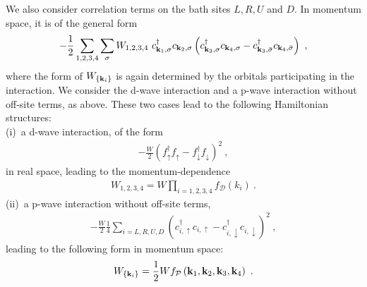 \documentclass[reprint,hidelinks]{revtex4-2}
\begin{document}
We also consider correlation terms on the bath sites \(L,R,U\) and \(D\). In momentum space, it is of the general form
\begin{equation}\begin{aligned}
-\frac{1}{2}\sum_{1, 2, 3, 4}\sum_\sigma W_{1,2,3,4}~ c^\dagger_{{\bf k}_1,\sigma}c_{{\bf k}_2,\sigma}\left(c^\dagger_{{\bf k}_3,\sigma}c_{{\bf k}_4,\sigma} - c^\dagger_{{\bf k}_3,\bar\sigma}c_{{\bf k}_4,\bar\sigma}\right) ~,
\end{aligned}\end{equation}
where the form of \(W_{\left\{{\bf k}_i\right\}}\) is again determined by the orbitals participating in the interaction. We consider the d-wave interaction and a p-wave interaction without off-site terms, as above. These two cases lead to the following Hamiltonian structures:\\
(i)~a d-wave interaction, of the form 
\begin{equation}\begin{aligned}
	-\frac{W}{2}\left(f^\dagger_{\uparrow}f_{\uparrow} - f^\dagger_{\downarrow}f_{\downarrow}\right)^2~,
\end{aligned}\end{equation}
in real space, leading to the momentum-dependence
\begin{equation}\begin{aligned}\label{W_dwave}
	W_{1,2,3,4} = W\prod_{i=1,2,3,4}f_\mathcal{D}(k_i)~.
\end{aligned}\end{equation}
(ii)~a p-wave interaction without off-site terms, 
\begin{equation}\begin{aligned}
	-\frac{W}{2}\frac{1}{4}\sum_{i=L,R,U,D}\left(c^\dagger_{i,\uparrow}c_{i,\uparrow} - c^\dagger_{i,\downarrow}c_{i,\downarrow}\right)^2~,
\end{aligned}\end{equation}
leading to the following form in momentum space:
\begin{equation}\begin{aligned}\label{W_pwave_nooffsite}
	W_{\left\{{\bf k}_i\right\}} = \frac{1}{2}W f_\mathcal{P}\left({\bf k}_1, {\bf k}_2, {\bf k}_3, {\bf k}_4\right) ~.
\end{aligned}\end{equation}
\end{document}
